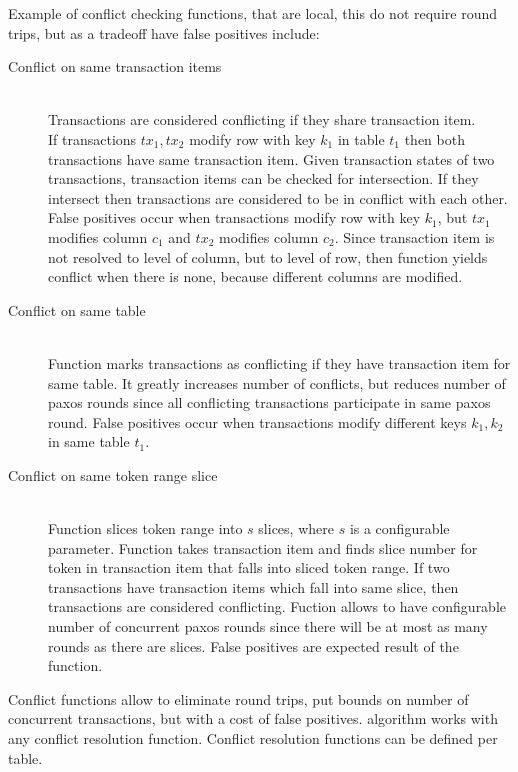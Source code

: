 Example of conflict checking functions, that are local, this do not require round trips, but as a tradeoff have false positives include:
\begin{description}
\item[Conflict on same transaction items] \hfill \\
	Transactions are considered conflicting if they share transaction item. 
	\\
	If transactions $tx_{1}, tx{_2}$ modify row with key $k_{1}$ in table $t_{1}$ then both transactions have same transaction item. Given transaction states of two transactions, transaction items can be checked for intersection.
	If they intersect then transactions are considered to be in conflict with each other. \\
	False positives occur when transactions modify row with key $k_{1}$, but $tx_{1}$ modifies column $c_{1}$ and $tx_{2}$ modifies column $c_{2}$. Since transaction item is not resolved to level of column, but to level of row, then function yields conflict when there is none, because different columns are modified.	
\item[Conflict on same table] \hfill \\
		Function marks transactions as conflicting if they have transaction item for same table. It greatly increases number of conflicts, but reduces number of paxos rounds since all conflicting transactions participate in same paxos round.
		False positives occur when transactions modify different keys $k_{1}, k_{2}$ in same table $t_{1}$. 
\item[Conflict on same token range slice] \hfill \\
		Function slices token range into $s$ slices, where $s$ is a configurable parameter. Function takes transaction item and finds slice number for token in transaction item that falls into sliced token range. If two transactions have transaction items which fall into same slice, then transactions are considered conflicting.
		Fuction allows to have configurable number of concurrent paxos rounds since there will be at most as many rounds as there are slices. False positives are expected result of the function.
\end{description}

Conflict functions allow to eliminate round trips, put bounds on number of concurrent transactions, but with a cost of false positives. \mpp algorithm works with any conflict resolution function. Conflict resolution functions can be defined per table.

